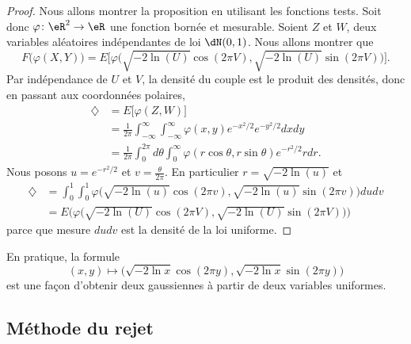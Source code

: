 \begin{proof}
	Nous allons montrer la proposition en utilisant les fonctions tests. Soit donc \( \varphi\colon \eR^2\to \eR\) une fonction bornée et mesurable. Soient \( Z\) et \( W\), deux variables aléatoires indépendantes de loi \( \dN(0,1)\). Nous allons montrer que
	\begin{equation}
		F\big( \varphi(X,Y) \big)=E\Big[ \varphi\big( \sqrt{-2\ln(U)}\cos(2\pi V),\sqrt{-2\ln(U)}\sin(2\pi V) \big) \Big].
	\end{equation}
	Par indépendance de \( U\) et \( V\), la densité du couple est le produit des densités, donc en passant aux coordonnées polaires,
	\begin{subequations}
		\begin{align}
			\diamondsuit & =E\big[ \varphi(Z,W) \big]                                                                            \\
			             & =\frac{1}{ 2\pi }\int_{-\infty}^{\infty}\int_{-\infty}^{\infty}\varphi(x,y) e^{-x^2/2} e^{-y^2/2}dxdy \\
			             & =\frac{1}{ 2\pi }\int_0^{2\pi}d\theta\int_0^{\infty}\varphi(r\cos\theta,r\sin\theta) e^{-r^2/2}rdr.
		\end{align}
	\end{subequations}
	Nous posons \( u= e^{-r^2/2}\) et \( v=\frac{ \theta }{ 2\pi }\). En particulier \( r=\sqrt{-2\ln(u)}\) et
	\begin{subequations}
		\begin{align}
			\diamondsuit & =\int_0^1\int_0^1\varphi\big( \sqrt{-2\ln(u)}\cos(2\pi v),\sqrt{-2\ln(u)}\sin(2\pi v) \big)dudv \\
			             & =E\Big( \varphi\big( \sqrt{-2\ln(U)}\cos(2\pi V),\sqrt{-2\ln(U)}\sin(2\pi V) \big) \Big)
		\end{align}
	\end{subequations}
	parce que mesure \( dudv\) est la densité de la loi uniforme.
\end{proof}

En pratique, la formule
\begin{equation}
	(x,y)\mapsto\big( \sqrt{-2\ln x}\cos(2\pi y),\sqrt{-2\ln x}\sin(2\pi y) \big)
\end{equation}
est une façon d'obtenir deux gaussiennes à partir de deux variables uniformes.

\subsection{Méthode du rejet}

